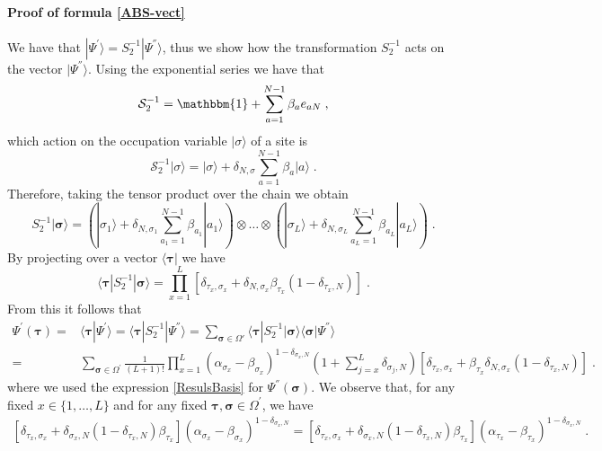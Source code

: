 \documentclass[10pt]{article}
\numberwithin{equation}{section}
\numberwithin{equation}{subsection}
\newcommand{\co}{\;,}
\newcommand{\dt}{\;.}
\begin{document}
\paragraph{Proof of formula \eqref{ABS-vect}} We have that $|\Psi^{'}\rangle=S_{2}^{-1}|\Psi^{''}\rangle$, thus we  show how the transformation $S_{2}^{-1}$ acts on the vector $|\Psi^{''}\rangle$. Using the exponential series we have that  
\begin{equation}
   \mathcal{S}_{2}^{-1}=\mathbbm{1}+\sum_{a=1}^{N-1}\beta_{a}e_{aN}\co
\end{equation}
which action on the occupation variable $|\sigma\rangle$ of a site is 
\begin{equation}
  \mathcal{S}_{2}^{-1} |\sigma\rangle= |\sigma\rangle+\delta_{N,\sigma}\sum_{a=1}^{N-1}\beta_a|a\rangle\dt
\end{equation} 
Therefore, taking the tensor product over the chain we obtain 
\begin{equation}
 S_{2}^{-1} |\bm{\sigma}\rangle=\left( |\sigma_1\rangle+\delta_{N,\sigma_1}\sum_{a_1=1}^{N-1}\beta_{a_1}|a_1\rangle\right)\otimes\ldots\otimes \left( |\sigma_L\rangle+\delta_{N,\sigma_L}\sum_{a_L=1}^{N-1}\beta_{a_L}|a_L\rangle\right)\dt
\end{equation} 
By projecting over a vector $\langle \bm{\tau}|$ we have 
\begin{equation}\label{goodTP-S2}
  \langle \bm{\tau}|S_{2}^{-1} |\bm{\sigma}\rangle=\prod_{x=1}^L\left[ \delta_{\tau_x,\sigma_x}+\delta_{N,\sigma_x}\beta_{\tau_x} (1-\delta_{\tau_x,N})\right]\dt
\end{equation} 
From this it follows that
\begin{align}\label{ABS_intermediate}
		\Psi^{'}(\bm{\tau})=&\langle\bm{\tau}|\Psi^{'}\rangle=\langle \bm{\tau}|S_{2}^{-1}|\Psi^{''}\rangle = \sum_{\bm{\sigma}\in \Omega'}  \langle \bm{\tau}|S_{2}^{-1} |\bm{\sigma}\rangle\langle\bm{\sigma}|\Psi^{''}\rangle \nonumber\\=&\sum_{\bm{\sigma}\in \Omega^{'}}\frac{1}{(L+1)!}\prod_{x=1}^L(\alpha_{\sigma_{x}}-\beta_{\sigma_{x}})^{1-\delta_{\sigma_{x},N}}\left(1+\sum_{j=x}^{L}\delta_{\sigma_{j},N}\right)\left[ \delta_{\tau_x,\sigma_x}+\beta_{\tau_x} \delta_{N,\sigma_x} (1-\delta_{\tau_x,N})\right]\dt
	\end{align}
	where we used the expression \eqref{ResulsBasis} for $\Psi^{''}(\bm{\sigma})$.
We observe that, for any fixed $x\in \{1,\ldots,L\}$ and for any fixed $\bm{\tau},\bm{\sigma}\in\Omega^{'}$, we have 
\begin{align}
	\left[\delta_{\tau_{x},\sigma_{x}}+\delta_{\sigma_{x},N}(1-\delta_{\tau_{x},N})\beta_{\tau_{x}}\right]\left(\alpha_{\sigma_{x}}-\beta_{\sigma_{x}}\right)^{1-\delta_{\sigma_{x},N}}=	\left[\delta_{\tau_{x},\sigma_{x}}+\delta_{\sigma_{x},N}(1-\delta_{\tau_{x},N})\beta_{\tau_{x}}\right]\left(\alpha_{\tau_{x}}-\beta_{\tau_{x}}\right)^{1-\delta_{\sigma_{x},N}}\dt
\end{align}
\end{document}
